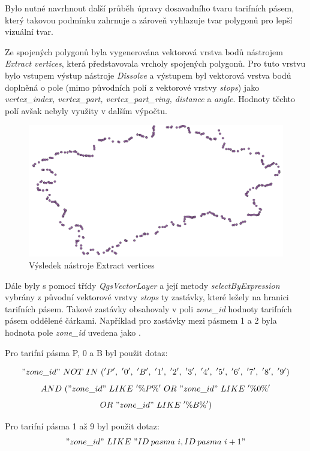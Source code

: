 Bylo nutné navrhnout další průběh úpravy dosavadního tvaru tarifních pásem, který takovou podmínku zahrnuje
a zároveň vyhlazuje tvar polygonů pro lepší vizuální tvar.  

Ze spojených polygonů byla vygenerována vektorová vrstva bodů nástrojem
\textit{Extract vertices}, která představovala vrcholy spojených polygonů. Pro tuto vrstvu
bylo vstupem výstup nástroje \textit{Dissolve} a výstupem byl vektorová vrstva bodů 
doplněná o pole (mimo původních polí z vektorové vrstvy \textit{stops}) jako \textit{vertex\_index,
vertex\_part, vertex\_part\_ring, distance} a \textit{angle}.
Hodnoty těchto polí avšak nebyly využity v dalším výpočtu.

\begin{figure}[H] \centering
    \includegraphics[width=400pt]{./pictures/vertices-P0B.png}
    \caption[Výsledek nástroje Extract vertices]{Výsledek nástroje Extract vertices}
	\label{fig:vertices-P0B}              
\end{figure} 

Dále byly s pomocí třídy \textit{QgsVectorLayer} a její metody \textit{selectByExpression} vybrány 
z původní vektorové vrstvy \textit{stops} ty zastávky, které ležely na hranici tarifních pásem.
Takové zastávky obsahovaly v poli \textit{zone\_id} hodnoty tarifních pásem od\-dělené čárkami.
Například pro zastávky mezi pásmem 1 a 2 byla hodnota pole \textit{zone\_id} uvedena jako .

Pro tarifní pásma P, 0 a B byl použit dotaz:

\["zone\_id"\ NOT\ IN\ ('P',\ '0',\ 'B',\ '1',\ '2',\ '3',\ '4',\ '5',\ '6',\ '7',\ '8',\ '9')\]
\[AND\ ("zone\_id"\ LIKE\ '\%P\%'\ OR\ "zone\_id"\ LIKE\ '\%0\%'\]
\[OR\ "zone\_id"\ LIKE\ '\%B\%')\]

Pro tarifní pásma 1 až 9 byl použit dotaz:
\["zone\_id"\ LIKE\ "ID\: pasma\ i,ID\: pasma\ i+1"\]

